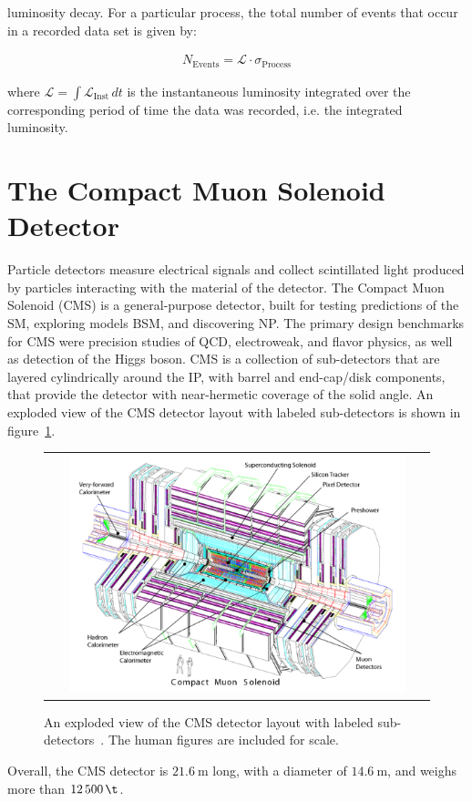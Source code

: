 luminosity decay.
For a particular process, the total number of events that occur in a recorded data set is given by:
\begin{linenomath*}
\begin{align}
N_{\text {Events}}= \mathcal{L} \cdot \sigma_{\text{Process}}
\end{align}
\end{linenomath*}
where $\mathcal{L} = \int \mathcal{L}_{\text{Inst}} \,dt$ is the instantaneous luminosity integrated over the corresponding period of time the data was recorded, i.e. the integrated luminosity.

\section{The Compact Muon Solenoid Detector}
Particle detectors measure electrical signals and collect scintillated light produced by particles interacting with the material of the detector.
The Compact Muon Solenoid (CMS) is a general-purpose detector, built for testing predictions of the SM, exploring models BSM, and discovering NP.
The primary design benchmarks for CMS were precision studies of QCD, electroweak, and flavor physics, as well as detection of the Higgs boson.
CMS is a collection of sub-detectors that are layered cylindrically around the IP, with barrel and end-cap/disk components, that provide the detector with near-hermetic coverage of the solid angle.
An exploded view of the CMS detector layout with labeled sub-detectors is shown in figure~\ref{CMS_Detector}.
\begin{figure}[!htb]
  \begin{center}
    \begin{tabular}{c}
        \includegraphics[width=0.9\textwidth]{fig_LHC_CMS/CMS_Detector.pdf}
    \end{tabular}
    \caption{An exploded view of the CMS detector layout with labeled sub-detectors~\cite{Bayatian:922757}.
            The human figures are included for scale.
            }
    \label{CMS_Detector}
  \end{center}
\end{figure}
Overall, the CMS detector is $\SI{21.6}{\m}$ long, with a diameter of $\SI{14.6}{\m}$, and weighs more than $\SI{12500}{\t}$.

